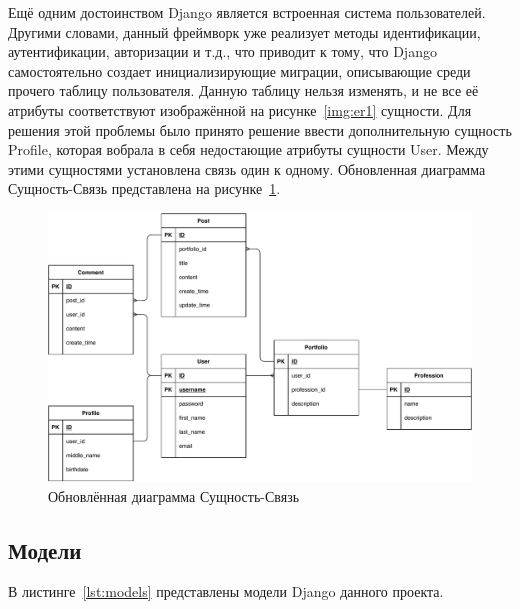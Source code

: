 Ещё одним достоинством Django является встроенная система пользователей. Другими словами, данный фреймворк уже реализует методы идентификации, аутентификации, авторизации и т.д., что приводит к тому, что Django самостоятельно создает инициализирующие миграции, описывающие среди прочего таблицу пользователя. Данную таблицу нельзя изменять, и не все её атрибуты соответствуют изображённой на рисунке~\ref{img:er1} сущности. Для решения этой проблемы было принято решение ввести дополнительную сущность Profile, которая вобрала в себя недостающие атрибуты сущности User. Между этими сущностями установлена связь один к одному. Обновленная диаграмма Сущность-Связь представлена на рисунке~\ref{img:er2}.

\begin{figure}[H]
    \centering
    \includegraphics[scale=0.65]{pdf/er2.pdf}
    \caption{Обновлённая диаграмма Сущность-Связь}\label{img:er2}
\end{figure}

\subsection{Модели}%
\label{sub:modeli}

В листинге~\ref{lst:models} представлены модели Django данного проекта.

